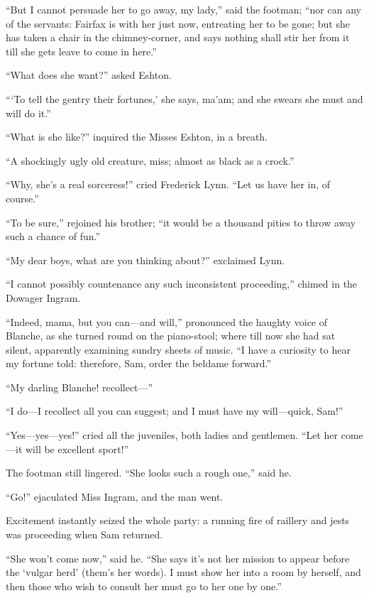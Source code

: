\enquote{But I cannot persuade her to go away, my lady,} said the
footman; \enquote{nor can any of the servants: \Mrs{} Fairfax is with her
just now, entreating her to be gone; but she has taken a chair in the
chimney-corner, and says nothing shall stir her from it till she gets
leave to come in here.}

\enquote{What does she want?} asked \Mrs{} Eshton.

\enquote{\enquote{To tell the gentry their fortunes,} she says, ma'am;
and she swears she must and will do it.}

\enquote{What is she like?} inquired the Misses Eshton, in a breath.

\enquote{A shockingly ugly old creature, miss; almost as black as a
crock.}

\enquote{Why, she's a real sorceress!} cried Frederick Lynn. 
\enquote{Let us have her in, of course.}

\enquote{To be sure,} rejoined his brother; \enquote{it would be a
thousand pities to throw away such a chance of fun.}

\enquote{My dear boys, what are you thinking about?} exclaimed \Mrs{}
Lynn.

\enquote{I cannot possibly countenance any such inconsistent
proceeding,} chimed in the Dowager Ingram.

\enquote{Indeed, mama, but you can---and will,} pronounced the haughty
voice of Blanche, as she turned round on the piano-stool; where till now
she had sat silent, apparently examining sundry sheets of music. 
\enquote{I have a curiosity to hear my fortune told: therefore, Sam,
order the beldame forward.}

\enquote{My darling Blanche! recollect---}

\enquote{I do---I recollect all you can suggest; and I must have my
will---quick, Sam!}

\enquote{Yes---yes---yes!} cried all the juveniles, both ladies and
gentlemen. \enquote{Let her come---it will be excellent sport!}

The footman still lingered. \enquote{She looks such a rough one,} said
he.

\enquote{Go!} ejaculated Miss Ingram, and the man went.

Excitement instantly seized the whole party: a running fire of raillery
and jests was proceeding when Sam returned.

\enquote{She won't come now,} said he. \enquote{She says it's not her
mission to appear before the \enquote{vulgar herd} (them's her words). 
I must show her into a room by herself, and then those who wish to
consult her must go to her one by one.}

